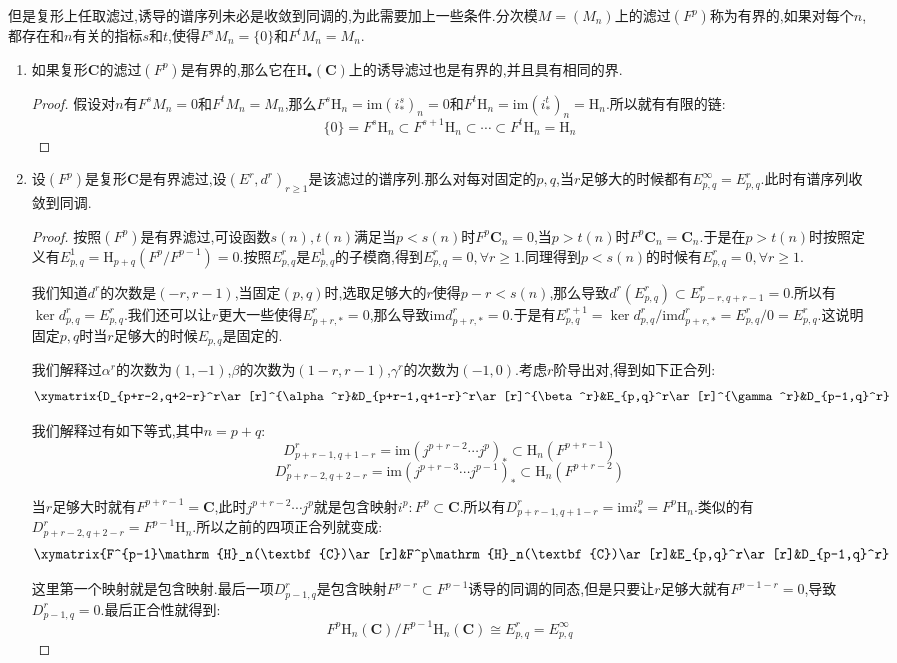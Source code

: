 但是复形上任取滤过,诱导的谱序列未必是收敛到同调的,为此需要加上一些条件.分次模$M=(M_n)$上的滤过$(F^p)$称为有界的,如果对每个$n$,都存在和$n$有关的指标$s$和$t$,使得$F^sM_n=\{0\}$和$F^tM_n=M_n$.
\begin{enumerate}
	\item 如果复形$\textbf{C}$的滤过$(F^p)$是有界的,那么它在$\mathrm{H}_{\bullet}(\textbf{C})$上的诱导滤过也是有界的,并且具有相同的界.
	\begin{proof}
		
		假设对$n$有$F^sM_n=0$和$F^tM_n=M_n$,那么$F^s\mathrm{H}_n=\mathrm{im}(i_*^s)_n=0$和$F^t\mathrm{H}_n=\mathrm{im}(i_*^t)_n=\mathrm{H}_n$.所以就有有限的链:
		$$\{0\}=F^s\mathrm{H}_n\subset F^{s+1}\mathrm{H}_n\subset\cdots\subset F^t\mathrm{H}_n=\mathrm{H}_n$$
	\end{proof}
    \item 设$(F^p)$是复形$\textbf{C}$是有界滤过,设$(E^r,d^r)_{r\ge1}$是该滤过的谱序列.那么对每对固定的$p,q$,当$r$足够大的时候都有$E_{p,q}^{\infty}=E_{p,q}^r$.此时有谱序列收敛到同调.
    \begin{proof}
    	
    	按照$(F^p)$是有界滤过,可设函数$s(n),t(n)$满足当$p<s(n)$时$F^p\textbf{C}_n=0$,当$p>t(n)$时$F^p\textbf{C}_n=\textbf{C}_n$.于是在$p>t(n)$时按照定义有$E_{p,q}^1=\mathrm{H}_{p+q}(F^p/F^{p-1})=0$.按照$E_{p,q}^r$是$E^1_{p,q}$的子模商,得到$E_{p,q}^r=0,\forall r\ge1$.同理得到$p<s(n)$的时候有$E_{p,q}^r=0,\forall r\ge1$.
    	
    	我们知道$d^r$的次数是$(-r,r-1)$,当固定$(p,q)$时,选取足够大的$r$使得$p-r<s(n)$,那么导致$d^r(E_{p,q}^r)\subset E_{p-r,q+r-1}^r=0$.所以有$\ker d^r_{p,q}=E_{p,q}^r$.我们还可以让$r$更大一些使得$E_{p+r,*}^r=0$,那么导致$\mathrm{im}d_{p+r,*}^r=0$.于是有$E_{p,q}^{r+1}=\ker d_{p,q}^r/\mathrm{im}d^r_{p+r,*}=E_{p,q}^r/0=E_{p,q}^r$.这说明固定$p,q$时当$r$足够大的时候$E_{p,q}$是固定的.
    	
    	我们解释过$\alpha^r$的次数为$(1,-1)$,$\beta$的次数为$(1-r,r-1)$,$\gamma^r$的次数为$(-1,0)$.考虑$r$阶导出对,得到如下正合列:
    	$$\xymatrix{D_{p+r-2,q+2-r}^r\ar[r]^{\alpha^r}&D_{p+r-1,q+1-r}^r\ar[r]^{\beta^r}&E_{p,q}^r\ar[r]^{\gamma^r}&D_{p-1,q}^r}$$
    	
    	我们解释过有如下等式,其中$n=p+q$:
    	$$D_{p+r-1,q+1-r}^r=\mathrm{im}(j^{p+r-2}\cdots j^p)_*\subset\mathrm{H}_n(F^{p+r-1})$$
    	$$D_{p+r-2,q+2-r}^r=\mathrm{im}(j^{p+r-3}\cdots j^{p-1})_*\subset\mathrm{H}_n(F^{p+r-2})$$
    	
    	当$r$足够大时就有$F^{p+r-1}=\textbf{C}$,此时$j^{p+r-2}\cdots j^p$就是包含映射$i^p:F^p\subset\textbf{C}$.所以有$D_{p+r-1,q+1-r}^r=\mathrm{im}i^p_*=F^p\mathrm{H}_n$.类似的有$D_{p+r-2,q+2-r}^r=F^{p-1}\mathrm{H}_n$.所以之前的四项正合列就变成:
    	$$\xymatrix{F^{p-1}\mathrm{H}_n(\textbf{C})\ar[r]&F^p\mathrm{H}_n(\textbf{C})\ar[r]&E_{p,q}^r\ar[r]&D_{p-1,q}^r}$$
    	
    	这里第一个映射就是包含映射.最后一项$D_{p-1,q}^r$是包含映射$F^{p-r}\subset F^{p-1}$诱导的同调的同态,但是只要让$r$足够大就有$F^{p-1-r}=0$,导致$D_{p-1,q}^r=0$.最后正合性就得到:
    	$$F^p\mathrm{H}_n(\textbf{C})/F^{p-1}\mathrm{H}_n(\textbf{C})\cong E_{p,q}^r=E_{p,q}^{\infty}$$
    \end{proof}
\end{enumerate}


